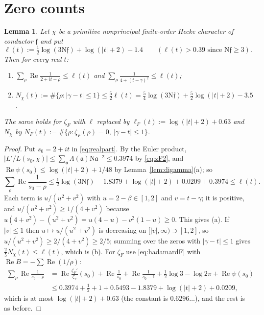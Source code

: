 \documentclass[11pt]{article}
\newtheorem{lemma}{Lemma}[section]
\theoremstyle{definition}
\theoremstyle{remark}
\numberwithin{equation}{section}
\newcommand{\fa}{\mathfrak a}
\newcommand{\ff}{\mathfrak f}
\newcommand{\Nm}{\mathrm N}
\newcommand{\Rea}{\operatorname{Re}}
\begin{document}
\section{Zero counts}\label{sec:zeros}

\begin{lemma}\label{lem:zeros}
Let $\chi$ be a primitive nonprincipal finite-order Hecke character of conductor $\ff$ and put
\[
 \ell(t):=\tfrac12\log(3\Nm\ff)+\log(|t|+2)-1.4\qquad(\ell(t)>0.39\text{ since }\Nm\ff\ge3).
\]
Then for every real $t$:
\begin{enumerate}
\item[\textup{(a)}] $\displaystyle\sum_\rho\Rea\frac1{2+it-\rho}\le\ell(t)$ and $\displaystyle\sum_\rho\frac1{4+(t-\gamma)^2}\le\ell(t)$;
\item[\textup{(b)}] $N_\chi(t):=\#\{\rho:|\gamma-t|\le1\}\le\tfrac52\ell(t)=\tfrac54\log(3\Nm\ff)+\tfrac52\log(|t|+2)-3.5$.
\end{enumerate}
The same holds for $\zeta_F$ with $\ell$ replaced by $\ell_F(t):=\log(|t|+2)+0.63$ and $N_\chi$ by $N_F(t):=\#\{\rho:\zeta_F(\rho)=0,\ |\gamma-t|\le1\}$.
\end{lemma}

\begin{proof}
Put $s_0=2+it$ in \eqref{eq:realpart}. By the Euler product, $|L'/L(s_0,\chi)|\le\sum_\fa\Lambda(\fa)\Nm\fa^{-2}\le0.3974$ by \eqref{eq:zF2}, and $\Rea\psi(s_0)\le\log(|t|+2)+1/48$ by Lemma~\ref{lem:digamma}(a); so
\[
 \sum_\rho\Rea\frac1{s_0-\rho}\le\tfrac12\log(3\Nm\ff)-1.8379+\log(|t|+2)+0.0209+0.3974\le\ell(t).
\]
Each term is $u/(u^2+v^2)$ with $u=2-\beta\in[1,2]$ and $v=t-\gamma$; it is positive, and $u/(u^2+v^2)\ge1/(4+v^2)$ because $u(4+v^2)-(u^2+v^2)=u(4-u)-v^2(1-u)\ge0$. This gives (a). If $|v|\le1$ then $u\mapsto u/(u^2+v^2)$ is decreasing on $[|v|,\infty)\supset[1,2]$, so $u/(u^2+v^2)\ge2/(4+v^2)\ge2/5$; summing over the zeros with $|\gamma-t|\le1$ gives $\tfrac25N_\chi(t)\le\ell(t)$, which is (b). For $\zeta_F$ use \eqref{eq:hadamardF} with $\Rea B=-\sum\Rea(1/\rho)$:
\begin{align*}
 \sum_\rho\Rea\frac1{s_0-\rho}&=\Rea\frac{\zeta_F'}{\zeta_F}(s_0)+\Rea\frac1{s_0}+\Rea\frac1{s_0-1}+\tfrac12\log3-\log2\pi+\Rea\psi(s_0)\\
 &\le0.3974+\tfrac12+1+0.5493-1.8379+\log(|t|+2)+0.0209,
\end{align*}
which is at most $\log(|t|+2)+0.63$ (the constant is $0.6296\ldots$), and the rest is as before.
\end{proof}
\end{document}
